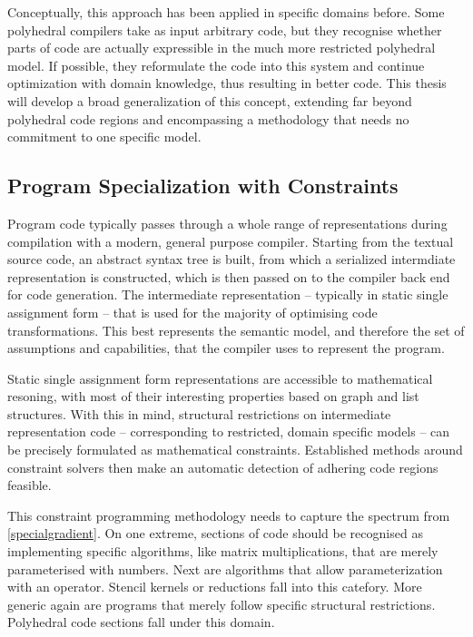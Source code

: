     Conceptually, this approach has been applied in specific domains before.
    Some polyhedral compilers take as input arbitrary code, but they recognise
    whether parts of code are actually expressible in the much more restricted
    polyhedral model.
    If possible, they reformulate the code into this system and continue
    optimization with domain knowledge, thus resulting in better code.
    This thesis will develop a broad generalization of this concept, extending
    far beyond polyhedral code regions and encompassing a methodology that
    needs no commitment to one specific model.

\subsection{Program Specialization with Constraints}

    Program code typically passes through a whole range of representations
    during compilation with a modern, general purpose compiler.
    Starting from the textual source code, an abstract syntax tree is built,
    from which a serialized intermdiate representation is constructed,
    which is then passed on to the compiler back end for code generation.
    The intermediate representation -- typically in static single assignment
    form -- that is used for the majority of optimising code transformations.
    This best represents the semantic model, and therefore the set of
    assumptions and capabilities, that the compiler uses to represent the
    program.

    Static single assignment form representations are accessible to mathematical
    resoning, with most of their interesting properties based on graph and list
    structures.
    With this in mind, structural restrictions on intermediate representation
    code -- corresponding to restricted, domain specific models -- can be
    precisely formulated as mathematical constraints.
    Established methods around constraint solvers then make an automatic
    detection of adhering code regions feasible.

    This constraint programming methodology needs to capture the spectrum from
    \autoref{specialgradient}.
    On one extreme, sections of code should be recognised as implementing
    specific algorithms, like matrix multiplications, that are merely
    parameterised with numbers.
    Next are algorithms that allow parameterization with an operator.
    Stencil kernels or reductions fall into this catefory.
    More generic again are programs that merely follow specific structural
    restrictions.
    Polyhedral code sections fall under this domain.


